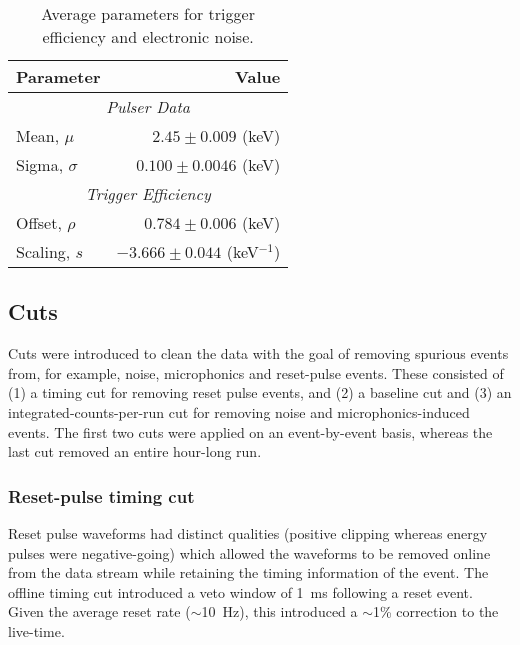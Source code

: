 				\begin{table}
					\centering
					\begin{tabular}{l r}
						\toprule
						Parameter & Value \\
						\midrule
						    \multicolumn{2}{c}{\emph{Pulser Data}} 	  \\
						    Mean, $\mu$ &  $2.45\pm0.009$ (keV) \\
						    Sigma, $\sigma$ &  $0.100\pm0.0046$ (keV) \\						    
						    \multicolumn{2}{c}{\emph{Trigger Efficiency}} 	  \\
						    Offset, $\rho$ &  $0.784\pm0.006$ (keV) \\
						    Scaling, $s$ &  $-3.666\pm0.044$ (keV$^{-1}$) \\						    						    
						\bottomrule
					\end{tabular}
					\caption[Average parameters for trigger efficiency and electronic noise]
					{Average parameters for trigger efficiency and electronic noise.}
					\label{tab:PPC2AvgPars}
				\end{table}	
	    	\subsection{Cuts}
		\label{sec:DeploymentPPC2SoudanAnalysisCuts}    
			
	Cuts were introduced to clean the data with the goal of removing spurious events from, for example, noise, microphonics and reset-pulse events.  These consisted of (1) a timing cut for removing reset pulse events, and (2) a baseline cut and (3) an integrated-counts-per-run cut for removing noise and microphonics-induced events.  The first two cuts were applied on an event-by-event basis, whereas the last cut removed an entire hour-long run. 
	
			\subsubsection{Reset-pulse timing cut}
	Reset pulse waveforms had distinct qualities (positive clipping whereas energy pulses were negative-going) which allowed the waveforms to be removed online from the data stream while retaining the timing information of the event.  The offline timing cut introduced a veto window of 1~ms following a reset event.  Given the average reset rate ($\sim$10~Hz), this introduced a $\sim$1\% correction to the live-time.  

